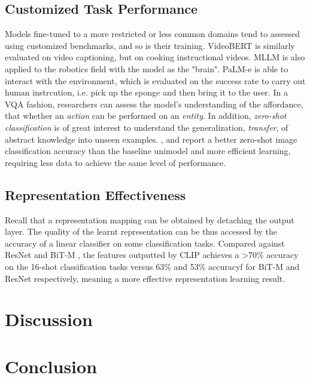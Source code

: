 \documentclass[11pt]{article}
\begin{document}
\subsection{Customized Task Performance}
Models fine-tuned to a more restricted or less common domains tend to assessed using customized benchmarks, and so is their training. VideoBERT \citep{DBLP:conf/iccv/SunMV0S19} is similarly evaluated on video captioning, but on cooking instructional videos. MLLM is also applied to the robotics field with the model as the "brain". PaLM-e \citep{DBLP:conf/icml/DriessXSLCIWTVY23} is able to interact with the environment, which is evaluated on the success rate to carry out human instrcution, i.e. pick up the sponge and then bring it to the user. In a VQA fashion, researchers can assess the model's understanding of the affordance, that whether an \textit{action} can be performed on an \textit{entity}. In addition, \textit{zero-shot classification} is of great interest to understand the generalization, \textit{transfer}, of abstract knowledge into unseen examples. \citet{DBLP:conf/icml/DriessXSLCIWTVY23}, \citet{DBLP:conf/icml/RadfordKHRGASAM21} and \citet{DBLP:conf/iccv/SunMV0S19} report a better zero-shot image classification accuracy than the baseline unimodel and more efficient learning, requiring less data to achieve the same level of performance. 

\subsection{Representation Effectiveness}
Recall that a representation mapping can be obtained by detaching the output layer. The quality of the learnt representation can be thus accessed by the accuracy of a linear classifier on some classification tasks. Compared against ResNet \citep{DBLP:journals/corr/HeZRS15} and BiT-M \citep{DBLP:conf/eccv/KolesnikovBZPYG20}, the features outputted by CLIP \citep{DBLP:conf/iccv/SunMV0S19} achieves a >70\% accuracy on the 16-shot classification tasks versus 63\% and 53\% accuracyf for BiT-M and ResNet respectively, meaning a more effective representation learning result. 

\section{Discussion}

\section{Conclusion}
\end{document}
